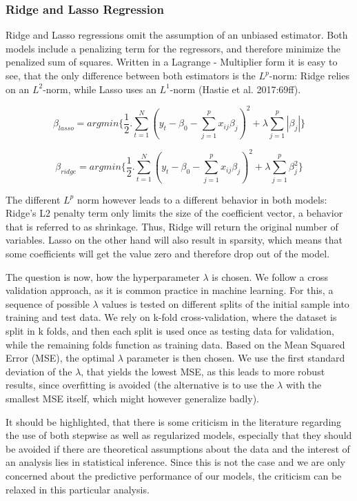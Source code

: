 \subsubsection{Ridge and Lasso Regression}
Ridge and Lasso regressions omit the assumption of an unbiased estimator. Both models include a penalizing term for the regressors, and therefore minimize the penalized sum of squares.  Written in a Lagrange - Multiplier form it is easy to see, that the only difference between both estimators is the $L^{p}$-norm: Ridge relies on an $L^{2}$-norm, while Lasso uses an  $L^{1}$-norm (Hastie et al. 2017:69ff).  

\begin{equation}
\beta_{lasso}=argmin\{\frac{1}{2}.\sum_{t=1}^{N}(y_{t}-\beta_{0}-\sum_{j=1}^{p}x_{ij}\beta_{j})^{2}+\lambda\sum_{j=1}^{p}|\beta_{j}|\}
\end{equation}

\begin{equation}
\beta_{ridge}=argmin\{\frac{1}{2}.\sum_{t=1}^{N}(y_{t}-\beta_{0}-\sum_{j=1}^{p}x_{ij}\beta_{j})^{2}+\lambda\sum_{j=1}^{p}\beta_{j}^{2}\}
\end{equation}

The different $L^{p}$ norm however leads to a different behavior in both models: Ridge's L2 penalty term only limits the size of the coefficient vector, a behavior that is referred to as shrinkage. Thus, Ridge will return the original number of variables.  Lasso on the other hand will also result in sparsity, which means that some coefficients will get the value zero and therefore drop out of the model. 

The question is now, how the hyperparameter $\lambda$ is chosen. We follow a cross validation approach, as it is common practice in machine learning. For this, a sequence of possible $\lambda$ values is tested on different splits  of the initial sample into training and test data.  We rely on  k-fold cross-validation, where the dataset is split in k folds, and then each split is used once as testing data for validation, while the remaining folds function as training data. 
Based on the Mean Squared Error (MSE), the optimal $\lambda$ parameter is then chosen. We use the first standard deviation of the $\lambda$, that yields the lowest MSE, as this leads to more robust results, since overfitting is avoided (the alternative is to use the  $\lambda$ with the smallest MSE itself, which might however generalize badly). 

It should be highlighted, that there is some criticism in the literature regarding the use of both stepwise as well as regularized models, especially that they should be avoided if there are theoretical assumptions about the data and the interest of an analysis lies in statistical inference. Since this is not the case and we are only concerned about the predictive performance of our models, the criticism can be relaxed in this particular analysis. 



